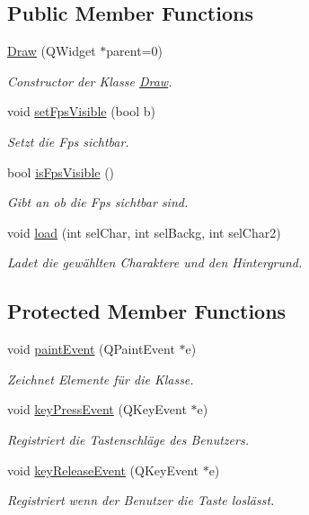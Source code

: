 \subsection*{Public Member Functions}
\begin{DoxyCompactItemize}
\item 
\hyperlink{class_draw_a04439e9d5f430ebe2c1cf8216b542930}{Draw} (Q\+Widget $\ast$parent=0)
\begin{DoxyCompactList}\small\item\em Constructor der Klasse \hyperlink{class_draw}{Draw}. \end{DoxyCompactList}\item 
void \hyperlink{class_draw_a2db5297d01a7a230a1e5a504e22e4b1a}{set\+Fps\+Visible} (bool b)
\begin{DoxyCompactList}\small\item\em Setzt die Fps sichtbar. \end{DoxyCompactList}\item 
bool \hyperlink{class_draw_a70803e861847ba4d1fce021502eb9d2b}{is\+Fps\+Visible} ()
\begin{DoxyCompactList}\small\item\em Gibt an ob die Fps sichtbar sind. \end{DoxyCompactList}\item 
void \hyperlink{class_draw_a14d84222a5d90e9061d5a46ccfae2539}{load} (int sel\+Char, int sel\+Backg, int sel\+Char2)
\begin{DoxyCompactList}\small\item\em Ladet die gewählten Charaktere und den Hintergrund. \end{DoxyCompactList}\end{DoxyCompactItemize}
\subsection*{Protected Member Functions}
\begin{DoxyCompactItemize}
\item 
void \hyperlink{class_draw_ae94babea5ece40d00e4c8e5e0b5506e7}{paint\+Event} (Q\+Paint\+Event $\ast$e)
\begin{DoxyCompactList}\small\item\em Zeichnet Elemente für die Klasse. \end{DoxyCompactList}\item 
void \hyperlink{class_draw_a6d1346ffb671cc8e622700125b0dbc60}{key\+Press\+Event} (Q\+Key\+Event $\ast$e)
\begin{DoxyCompactList}\small\item\em Registriert die Tastenschläge des Benutzers. \end{DoxyCompactList}\item 
void \hyperlink{class_draw_a9aff693268ed2232fbb4154617ea49cc}{key\+Release\+Event} (Q\+Key\+Event $\ast$e)
\begin{DoxyCompactList}\small\item\em Registriert wenn der Benutzer die Taste loslässt. \end{DoxyCompactList}\end{DoxyCompactItemize}


